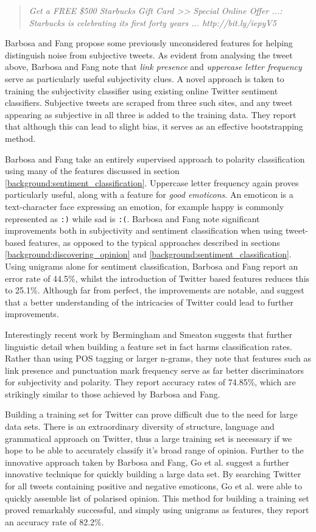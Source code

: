 \begin{quote}
	\emph{Get a FREE \$500 Starbucks Gift Card >> Special Online Offer ...: Starbucks is celebrating its first forty years ... http://bit.ly/iepyV5}
\end{quote}

Barbosa and Fang propose some previously unconsidered features for helping distinguish noise from subjective tweets. As evident from analysing the tweet above, Barbosa and Fang note that \emph{link presence} and \emph{uppercase letter frequency} serve as particularly useful subjectivity clues. A novel approach is taken to training the subjectivity classifier using existing online Twitter sentiment classifiers. Subjective tweets are scraped from three such sites, and any tweet appearing as subjective in all three is added to the training data. They report that although this can lead to slight bias, it serves as an effective bootstrapping method. 

Barbosa and Fang take an entirely supervised approach to polarity classification using many of the features discussed in section \ref{background:sentiment_classification}. Uppercase letter frequency again proves particularly useful, along with a feature for \emph{good emoticons}. An emoticon is a text-character face expressing an emotion, for example happy is commonly represented as \texttt{:)} while sad is \texttt{:(}. Barbosa and Fang note significant improvements both in subjectivity and sentiment classification when using tweet-based features, as opposed to the typical approaches described in sections \ref{background:discovering_opinion} and \ref{background:sentiment_classification}. Using unigrams alone for sentiment classification, Barbosa and Fang report an error rate of 44.5\%, whilst the introduction of Twitter based features reduces this to 25.1\%. Although far from perfect, the improvements are notable, and suggest that a better understanding of the intricacies of Twitter could lead to further improvements.

Interestingly recent work by Bermingham and Smeaton \cite{Bermingham:2010vh} suggests that further linguistic detail when building a feature set in fact harms classification rates. Rather than using POS tagging or larger n-grams, they note that features such as link presence and punctuation mark frequency serve as far better discriminators for subjectivity and polarity. They report accuracy rates of 74.85\%, which are strikingly similar to those achieved by Barbosa and Fang. 

Building a training set for Twitter can prove difficult due to the need for large data sets. There is an extraordinary diversity of structure, language and grammatical approach on Twitter, thus a large training set is necessary if we hope to be able to accurately classify it's broad range of opinion. Further to the innovative approach taken by Barbosa and Fang, Go et al. \cite{Go:2009ut} suggest a further innovative technique for quickly building a large data set. By searching Twitter for all tweets containing positive and negative emoticons, Go et al. were able to quickly assemble list of polarised opinion. This method for building a training set proved remarkably successful, and simply using unigrams as features, they report an accuracy rate of 82.2\%. 

